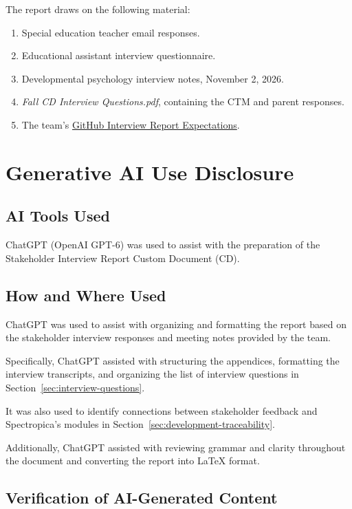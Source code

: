 \documentclass[12pt, titlepage]{article}
\begin{document}
The report draws on the following material:
\begin{enumerate}
\item Special education teacher email responses.
\item Educational assistant interview questionnaire.
\item Developmental psychology interview notes, November 2, 2026.
\item \emph{Fall CD Interview Questions.pdf}, containing the CTM and parent responses.
\item The team's \href{https://github.com/meena-alomran/game-n-grow/blob/main/docs/CDs/Interviews/Expectations.md}{GitHub Interview Report Expectations}.
\end{enumerate}

\section{Generative AI Use Disclosure}

\subsection{AI Tools Used}

ChatGPT (OpenAI GPT-6) was used to assist with the preparation of the
Stakeholder Interview Report Custom Document (CD).

\subsection{How and Where Used}

ChatGPT was used to assist with organizing and formatting the report based on
the stakeholder interview responses and meeting notes provided by the team.

Specifically, ChatGPT assisted with structuring the appendices, formatting
the interview transcripts, and organizing the list of interview questions in
Section~\ref{sec:interview-questions}.

It was also used to identify connections between stakeholder feedback and
Spectropica's modules in Section~\ref{sec:development-traceability}.

Additionally, ChatGPT assisted with reviewing grammar and clarity throughout
the document and converting the report into \LaTeX{} format.

\subsection{Verification of AI-Generated Content}
\end{document}
